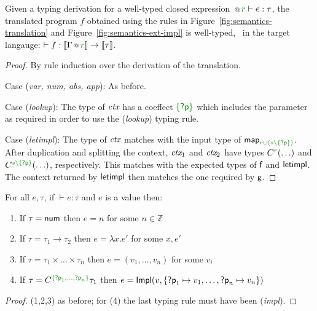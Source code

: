 \begin{theorem}
\label{thm:semantics-impl-welltyped}
Given a typing derivation for a well-typed closed expression $\coctx{}{\cclrd{r}} \vdash e : \tau$,
the translated program $f$ obtained using the rules in Figure~\ref{fig:semantics-translation}
and Figure~\ref{fig:semantics-ext-impl} is well-typed, \ie~in the target langauge: $\vdash f : \sem{\coctx{\Gamma}{\cclrd{r}}} \rightarrow \sem{\tau}$.
\end{theorem}
\begin{proof}
By rule induction over the derivation of the translation. 

\vspace{0.5em}\noindent\hangindent=0.6cm 
Case (\emph{var, num, abs, app}): As before.

\vspace{0.5em}\noindent\hangindent=0.6cm 
Case (\emph{lookup}): The type of $\textit{ctx}$ has a coeffect  $\cclrd{ \{\ident{?p}\} }$
  which includes the parameter  as required in order to use the (\emph{lookup}) typing rule.

\vspace{0.5em}\noindent\hangindent=0.6cm 
Case (\emph{letimpl}): The type of $\textit{ctx}$ matches with the input type of
  $\ident{map}_{  \cclrd{r \cup (s\setminus\{\ident{?p}\})} }$. After duplication and splitting
  the context, $\textit{ctx}_1$ and $\textit{ctx}_2$ have types $\ctyp{\cclrd{r}}(\ldots)$ and
  $\ctyp{\cclrd{s\setminus\{\ident{?p}\}}}(\ldots)$, respectively. This matches with the expected
  types of $\textnormal{\sffamily f}$ and $\textnormal{\sffamily letimpl}$. The context returned by $\textnormal{\sffamily letimpl}$ then 
  matches the one required by $\textnormal{\sffamily g}$.
\end{proof}

\begin{lemma}
\label{thm:semantics-impl-canon}
For all $e, \tau$, if $\vdash e : \tau$ and $e$ is a value then:
\begin{enumerate}
  \item If $\tau=\ident{num}$ then $e = n$ for some $n \in \mathbb{Z}$
  \item If $\tau=\tau_1 \rightarrow \tau_2$ then $e = \lambda x.e'$ for some $x, e'$
  \item If $\tau=\tau_1\times\ldots\times\tau_n$ then $e = (v_1, \ldots, v_n)$ for some $v_i$
  \item If $\tau=\ctyp{\cclrd{ \{ \ident{?p}_1, \ldots, \ident{?p}_n \} }}\tau_1$ then $e = \ident{Impl}(v, \{ \ident{?p}_1 \mapsto v_1, \ldots, \ident{?p}_n \mapsto v_n \} )$
\end{enumerate}  
\end{lemma}
\begin{proof}
  (1,2,3) as before; for (4) the last typing rule must have been (\emph{impl}).
\end{proof}


